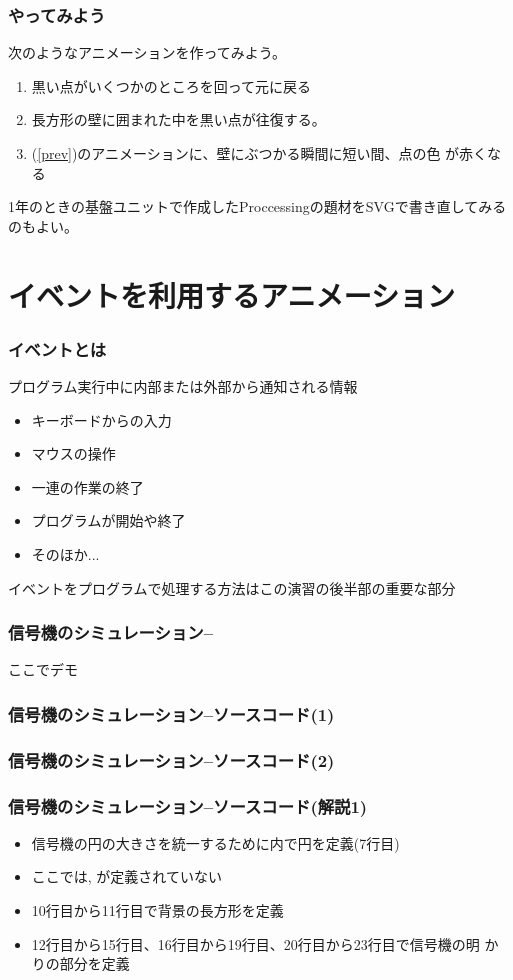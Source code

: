 \begin{frame}[containsverbatim]
 \frametitle{やってみよう}
 次のようなアニメーションを作ってみよう。
 \begin{enumerate}
	\item 黒い点がいくつかのところを回って元に戻る
	\item 長方形の壁に囲まれた中を黒い点が往復する。\label{prev}
	\item (\ref{prev})のアニメーションに、壁にぶつかる瞬間に短い間、点の色
				が赤くなる
 \end{enumerate}
 1年のときの基盤ユニットで作成したProccessingの題材をSVGで書き直してみる
 のもよい。
\end{frame}
\section{イベントを利用するアニメーション}
\begin{frame}[containsverbatim]
 \frametitle{イベントとは}
プログラム実行中に内部または外部から通知される情報
\begin{itemize}
 \item キーボードからの入力
 \item マウスの操作
 \item 一連の作業の終了
 \item プログラムが開始や終了
 \item そのほか...
\end{itemize}
イベントをプログラムで処理する方法はこの演習の後半部の重要な部分
\end{frame}
\begin{frame}[containsverbatim]
\frametitle{信号機のシミュレーション--}
ここでデモ
\end{frame}
\begin{frame}[containsverbatim]
 \frametitle{信号機のシミュレーション--ソースコード(1)}
\end{frame}
\begin{frame}[containsverbatim]
 \frametitle{信号機のシミュレーション--ソースコード(2)}
\end{frame}
\begin{frame}[containsverbatim]
 \frametitle{信号機のシミュレーション--ソースコード(解説1)}
\begin{itemize}
 \item 信号機の円の大きさを統一するために内で円を定義(7行目)
 \item ここでは, が定義されていない
 \item 10行目から11行目で背景の長方形を定義
 \item 12行目から15行目、16行目から19行目、20行目から23行目で信号機の明
       かりの部分を定義
\end{itemize}
\end{frame}

